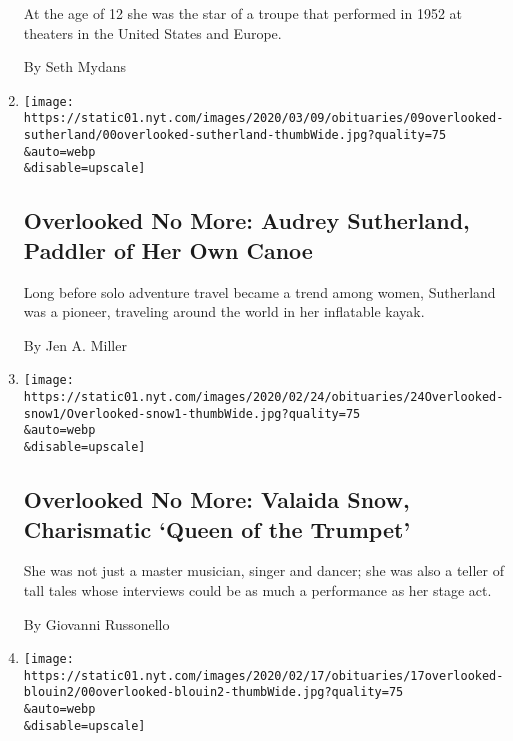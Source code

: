 \begin{enumerate}
  At the age of 12 she was the star of a troupe that performed in 1952
  at theaters in the United States and Europe.

  By Seth Mydans
\item
  \href{/2020/03/06/obituaries/audrey-sutherland-overlooked.html}{}

  \texttt{[image: https://static01.nyt.com/images/2020/03/09/obituaries/09overlooked-sutherland/00overlooked-sutherland-thumbWide.jpg?quality=75\\\&auto=webp\\\&disable=upscale]}

  \hypertarget{overlooked-no-more-audrey-sutherland-paddler-of-her-own-canoe}{%
  \subsection{Overlooked No More: Audrey Sutherland, Paddler of Her Own
  Canoe}\label{overlooked-no-more-audrey-sutherland-paddler-of-her-own-canoe}}

  Long before solo adventure travel became a trend among women,
  Sutherland was a pioneer, traveling around the world in her inflatable
  kayak.

  By Jen A. Miller
\item
  \href{/2020/02/22/obituaries/valaida-snow-overlooked-black-history-month.html}{}

  \texttt{[image: https://static01.nyt.com/images/2020/02/24/obituaries/24Overlooked-snow1/Overlooked-snow1-thumbWide.jpg?quality=75\\\&auto=webp\\\&disable=upscale]}

  \hypertarget{overlooked-no-more-valaida-snow-charismatic-queen-of-the-trumpet}{%
  \subsection{Overlooked No More: Valaida Snow, Charismatic `Queen of
  the
  Trumpet'}\label{overlooked-no-more-valaida-snow-charismatic-queen-of-the-trumpet}}

  She was not just a master musician, singer and dancer; she was also a
  teller of tall tales whose interviews could be as much a performance
  as her stage act.

  By Giovanni Russonello
\item
  \href{/2020/02/14/obituaries/andree-blouin-overlooked-black-history-month.html}{}

  \texttt{[image: https://static01.nyt.com/images/2020/02/17/obituaries/17overlooked-blouin2/00overlooked-blouin2-thumbWide.jpg?quality=75\\\&auto=webp\\\&disable=upscale]}


\end{enumerate}

